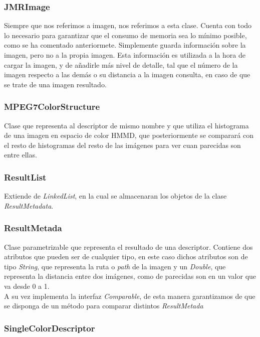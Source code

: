 \subsubsection{JMRImage}

Siempre que nos referimos a imagen, nos referimos a esta clase. Cuenta con todo lo necesario para garantizar que el consumo de memoria sea lo mínimo posible, como se ha comentado anteriormete. Simplemente guarda información sobre la imagen, pero no a la propia imagen. Esta información es utilizada a la hora de cargar la imagen, y de añadirle más nivel de detalle, tal que el número de la imagen respecto a las demás o su distancia a la imagen consulta, en caso de que se trate de una imagen resultado.

\subsubsection{MPEG7ColorStructure}

Clase que representa al descriptor de mismo nombre y que utiliza el histograma de una imagen en espacio de color HMMD, que posteriormente se comparará con el resto de histogramas del resto de las imágenes para ver cuan parecidas son entre ellas.

\subsubsection{ResultList}

Extiende de \textit{LinkedList}, en la cual se almacenaran los objetos de la clase \textit{ResultMetadata}.

\subsubsection{ResultMetada}

Clase parametrizable que representa el resultado de una descriptor. Contiene dos atributos que pueden ser de cualquier tipo, en este caso dichos atributos son de tipo \textit{String}, que representa la ruta o \textit{path} de la imagen y un \textit{Double}, que representa la distancia entre dos imágenes, como de parecidas son en un valor que va desde 0 a 1.\\

A su vez implementa la interfaz \textit{Comparable}, de esta manera garantizamos de que se disponga de un método para comparar distintos \textit{ResultMetada}

\subsubsection{SingleColorDescriptor}


